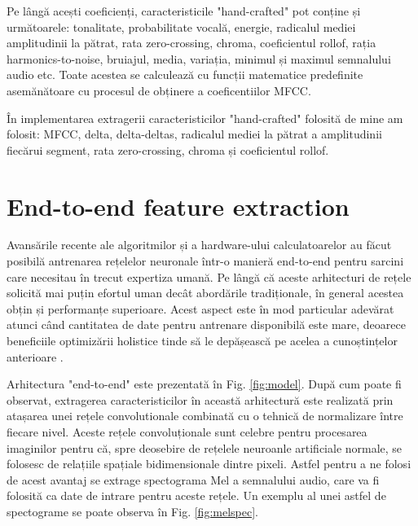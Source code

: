 \documentclass[a4paper,12pt]{book}
\begin{document}
				Pe lângă acești coeficienți, caracteristicile "hand-crafted" pot conține și următoarele: tonalitate, probabilitate vocală, energie,  radicalul mediei amplitudinii la pătrat, rata zero-crossing, chroma, coeficientul rollof, rația harmonics-to-noise, bruiajul, media, variația, minimul și maximul semnalului audio etc. Toate acestea se calculează cu funcții matematice predefinite asemănătoare cu procesul de obținere a coeficentiilor MFCC.			
				
				În implementarea extragerii caracteristicilor "hand-crafted" folosită de mine am folosit: MFCC, delta, delta-deltas, radicalul mediei la pătrat a amplitudinii fiecărui segment, rata zero-crossing, chroma și coeficientul rollof.
				
			\section{End-to-end feature extraction}	\label{end-to-end}
			
			Avansările recente ale algoritmilor și a hardware-ului calculatoarelor au făcut posibilă antrenarea rețelelor neuronale într-o manieră end-to-end pentru sarcini care necesitau în trecut expertiza umană. Pe lângă că aceste arhitecturi de rețele solicită mai puțin efortul uman decât abordările tradiționale, în general acestea obțin și performanțe superioare. Acest aspect este în mod particular adevărat atunci când cantitatea de date pentru antrenare disponibilă este mare, deoarece beneficiile optimizării holistice tinde să  le depășească pe acelea a cunoștințelor anterioare  \cite{graves}. \par
			
			Arhitectura "end-to-end" este prezentată în Fig. \ref{fig:model}. După cum poate fi observat, extragerea caracteristicilor în această  arhitectură este realizată prin atașarea unei rețele convolutionale  combinată cu o tehnică de normalizare între fiecare nivel. Aceste rețele convoluționale sunt celebre pentru procesarea imaginilor pentru că, spre deosebire de rețelele neuroanle artificiale normale, se folosesc de relațiile spațiale bidimensionale dintre pixeli. Astfel pentru a ne folosi de acest avantaj se extrage spectograma Mel a semnalului audio, care va fi folosită ca date de intrare pentru aceste rețele. Un exemplu al unei astfel de spectograme se poate observa în Fig. \ref{fig:melspec}. \par
						
\end{document}
